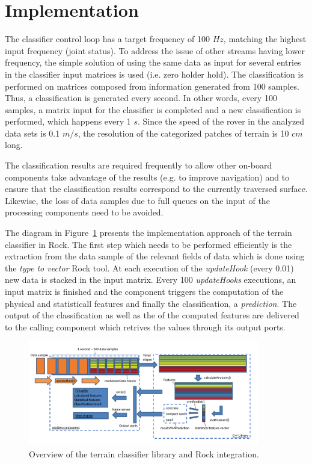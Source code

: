
\section{Implementation}

The classifier control loop has a target frequency of 100 $Hz$, matching the highest input frequency (joint status). 
To address the issue of other streams having lower frequency, the simple solution of using the same data as input for several entries in the classifier input matrices is used (i.e. zero holder hold). 
The classification is performed on matrices composed from information generated from 100 samples. 
Thus, a classification is generated every second.
In other words, every 100 samples, a matrix input for the classifier is completed and a new classification is performed, which happens every 1 $s$.
Since the speed of the rover in the analyzed data sets is 0.1 $m/s$, the resolution of the categorized patches of terrain is 10 $cm$ long.  

The classification results are required frequently to allow other on-board components take advantage of the results (e.g. to improve navigation) and to ensure that the classification results correspond to the currently traversed surface. 
Likewise, the loss of data samples due to full queues on the input of the processing components need to be avoided. 

The diagram in Figure~\ref{fig:overview} presents the implementation approach of the terrain classifier in Rock. 
The first step which needs to be performed efficiently is the extraction from the data sample of the relevant fields of data which is done using the \emph{type to vector} Rock tool.
At each execution of the \emph{updateHook} (every 0.01) new data is stacked in the input matrix.
Every 100 \emph{updateHooks} executions, an input matrix is finished and the component triggers the computation of the physical and statisticall features and finally the classification, a \emph{prediction}.
The output of the classification as well as the of the computed features are delivered to the calling component which retrives the values through its output ports. 

\begin{figure}[!htbp]
    \centering
    \includegraphics[width=0.9\textwidth]{../figures/OverviewTC2.pdf}
    \caption{\label{fig:overview}Overview of the terrain classifier library and Rock integration.}
\end{figure}

